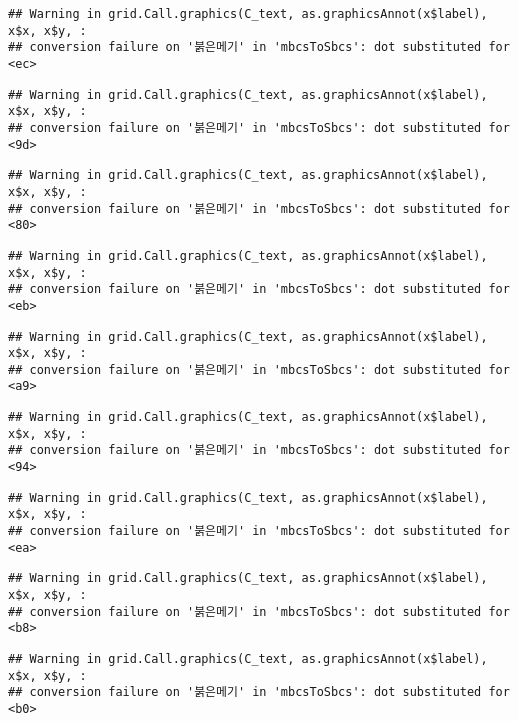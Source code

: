 \documentclass[
]{article}
\begin{document}
\begin{verbatim}
## Warning in grid.Call.graphics(C_text, as.graphicsAnnot(x$label), x$x, x$y, :
## conversion failure on '붉은메기' in 'mbcsToSbcs': dot substituted for <ec>
\end{verbatim}

\begin{verbatim}
## Warning in grid.Call.graphics(C_text, as.graphicsAnnot(x$label), x$x, x$y, :
## conversion failure on '붉은메기' in 'mbcsToSbcs': dot substituted for <9d>
\end{verbatim}

\begin{verbatim}
## Warning in grid.Call.graphics(C_text, as.graphicsAnnot(x$label), x$x, x$y, :
## conversion failure on '붉은메기' in 'mbcsToSbcs': dot substituted for <80>
\end{verbatim}

\begin{verbatim}
## Warning in grid.Call.graphics(C_text, as.graphicsAnnot(x$label), x$x, x$y, :
## conversion failure on '붉은메기' in 'mbcsToSbcs': dot substituted for <eb>
\end{verbatim}

\begin{verbatim}
## Warning in grid.Call.graphics(C_text, as.graphicsAnnot(x$label), x$x, x$y, :
## conversion failure on '붉은메기' in 'mbcsToSbcs': dot substituted for <a9>
\end{verbatim}

\begin{verbatim}
## Warning in grid.Call.graphics(C_text, as.graphicsAnnot(x$label), x$x, x$y, :
## conversion failure on '붉은메기' in 'mbcsToSbcs': dot substituted for <94>
\end{verbatim}

\begin{verbatim}
## Warning in grid.Call.graphics(C_text, as.graphicsAnnot(x$label), x$x, x$y, :
## conversion failure on '붉은메기' in 'mbcsToSbcs': dot substituted for <ea>
\end{verbatim}

\begin{verbatim}
## Warning in grid.Call.graphics(C_text, as.graphicsAnnot(x$label), x$x, x$y, :
## conversion failure on '붉은메기' in 'mbcsToSbcs': dot substituted for <b8>
\end{verbatim}

\begin{verbatim}
## Warning in grid.Call.graphics(C_text, as.graphicsAnnot(x$label), x$x, x$y, :
## conversion failure on '붉은메기' in 'mbcsToSbcs': dot substituted for <b0>
\end{verbatim}
\end{document}
